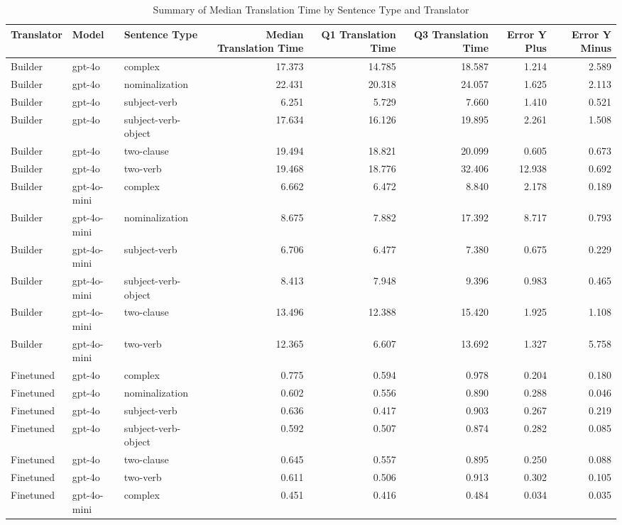 \begin{table}
\caption{Summary of Median Translation Time by Sentence Type and Translator}
\label{tab:median_translation_time_summary}
\begin{tabular}{lllrrrrr}
\toprule
Translator & Model & Sentence Type & Median Translation Time & Q1 Translation Time & Q3 Translation Time & Error Y Plus & Error Y Minus \\
\midrule
Builder & gpt-4o & complex & 17.373 & 14.785 & 18.587 & 1.214 & 2.589 \\
Builder & gpt-4o & nominalization & 22.431 & 20.318 & 24.057 & 1.625 & 2.113 \\
Builder & gpt-4o & subject-verb & 6.251 & 5.729 & 7.660 & 1.410 & 0.521 \\
Builder & gpt-4o & subject-verb-object & 17.634 & 16.126 & 19.895 & 2.261 & 1.508 \\
Builder & gpt-4o & two-clause & 19.494 & 18.821 & 20.099 & 0.605 & 0.673 \\
Builder & gpt-4o & two-verb & 19.468 & 18.776 & 32.406 & 12.938 & 0.692 \\
Builder & gpt-4o-mini & complex & 6.662 & 6.472 & 8.840 & 2.178 & 0.189 \\
Builder & gpt-4o-mini & nominalization & 8.675 & 7.882 & 17.392 & 8.717 & 0.793 \\
Builder & gpt-4o-mini & subject-verb & 6.706 & 6.477 & 7.380 & 0.675 & 0.229 \\
Builder & gpt-4o-mini & subject-verb-object & 8.413 & 7.948 & 9.396 & 0.983 & 0.465 \\
Builder & gpt-4o-mini & two-clause & 13.496 & 12.388 & 15.420 & 1.925 & 1.108 \\
Builder & gpt-4o-mini & two-verb & 12.365 & 6.607 & 13.692 & 1.327 & 5.758 \\
Finetuned & gpt-4o & complex & 0.775 & 0.594 & 0.978 & 0.204 & 0.180 \\
Finetuned & gpt-4o & nominalization & 0.602 & 0.556 & 0.890 & 0.288 & 0.046 \\
Finetuned & gpt-4o & subject-verb & 0.636 & 0.417 & 0.903 & 0.267 & 0.219 \\
Finetuned & gpt-4o & subject-verb-object & 0.592 & 0.507 & 0.874 & 0.282 & 0.085 \\
Finetuned & gpt-4o & two-clause & 0.645 & 0.557 & 0.895 & 0.250 & 0.088 \\
Finetuned & gpt-4o & two-verb & 0.611 & 0.506 & 0.913 & 0.302 & 0.105 \\
Finetuned & gpt-4o-mini & complex & 0.451 & 0.416 & 0.484 & 0.034 & 0.035 \\

\end{tabular}
\end{table}
